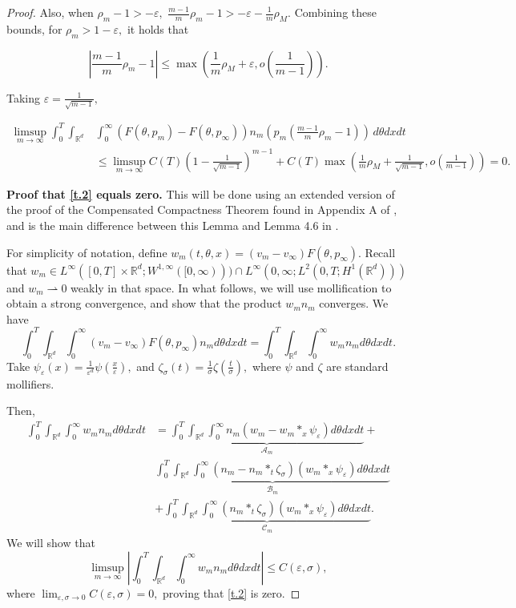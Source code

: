 \documentclass{amsart}
\def\R{\mathbb R}
\begin{document}
\begin{proof}
 Also, when $\rho_m-1>-\varepsilon,$ $\frac{m-1}{m}\rho_m-1> -\varepsilon-\frac{1}{m}\rho_M.$ Combining these bounds, for $\rho_m>1-\varepsilon,$ it holds that
  
  $$
  |\frac{m-1}{m}\rho_m-1|\leq \max(\frac{1}{m}\rho_M+\varepsilon,o(\frac{1}{m-1})).$$ 

  Taking $\varepsilon=\frac{1}{\sqrt{m-1}},$

  \begin{align*}
      \limsup_{m\rightarrow\infty}\int_{0}^{T}\int_{\R^d}&\int_{0}^{\infty}(F(\theta,p_m)-F(\theta,p_\infty))n_m(p_m(\frac{m-1}{m}\rho_m-1))\, d\theta dx dt\\& \leq \limsup_{m \rightarrow \infty}C(T)(1-\frac{1}{\sqrt{m-1}})^{m-1}+C(T)\max(\frac{1}{m}\rho_M+\frac{1}{\sqrt{m-1}}, o(\frac{1}{m-1})) = 0.
  \end{align*}

  \medskip
  \noindent \textbf{Proof that \eqref{t.2} equals zero.} This will be done using an extended version of the proof of the Compensated Compactness Theorem found in Appendix A of \cite{david}, and is the main difference between this Lemma and Lemma 4.6 in \cite{david}.

 For simplicity of notation, define $w_m(t,\theta,x)=(v_m-v_\infty)F(\theta,p_\infty)$.
 Recall that $w_m \in L^\infty([0,T]\times \R^d; W^{1,\infty}([0,\infty)))\cap L^\infty(0,\infty;L^2(0,T;H^1(\R^d))) $ and $w_m \rightharpoonup 0$ weakly in that space. In what follows, we will use mollification to obtain a strong convergence, and show that the product $w_m n_m$ converges.
 We have 
 $$
 \int_{0}^{T}\int_{\R^d}\int_{0}^{\infty}(v_m-v_\infty)F(\theta,p_\infty)n_md\theta dx dt =\int_{0}^{T}\int_{\R^d}\int_{0}^{\infty}w_m n_m d\theta dxdt.
 $$
 Take $\psi_\varepsilon(x)=\frac{1}{\varepsilon^d}\psi(\frac{x}{\varepsilon}),$ and $\zeta_\sigma (t)=\frac{1}{\sigma}\zeta(\frac{t}{\sigma}),$ where $\psi$ and $\zeta$ are standard mollifiers.

 Then,
 \begin{align*}
     \int_{0}^{T}\int_{\R^d}\int_{0}^{\infty}w_mn_md\theta dx dt &=\underbrace{\int_{0}^{T}\int_{\R^d}\int_{0}^{\infty}n_m(w_m -w_m*_x \psi_\varepsilon)d\theta dx dt}_{\mathcal{A}_m}+\\&\underbrace{\int_{0}^{T}\int_{\R^d}\int_{0}^{\infty}(n_m-n_m *_t \zeta_\sigma)(w_m *_x \psi_\varepsilon) d\theta dx dt }_{\mathcal{B}_m}
     \\&+\underbrace{\int_{0}^{T}\int_{\R^d}\int_{0}^{\infty}(n_m *_t \zeta_\sigma)(w_m *_x\psi_\varepsilon)d\theta dx dt}_{\mathcal{C}_m}.
 \end{align*}
 We will show that 
 $$
 \limsup_{m \rightarrow \infty}|\int_{0}^{T}\int_{\R^d}\int_{0}^{\infty}w_mn_md\theta dx dt|\leq C(\varepsilon,\sigma),
 $$
 where $\lim_{\varepsilon,\sigma \rightarrow 0}C(\varepsilon,\sigma)=0,$
 proving that \eqref{t.2} is zero. 
 

\end{proof}
\end{document}
